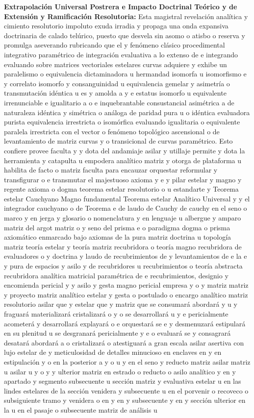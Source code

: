 \documentclass[11pt,a4paper]{article}
\theoremstyle{definition}
\theoremstyle{remark}
\numberwithin{equation}{section}
\begin{document}
\textbf{Extrapolación Universal Postrera e Impacto Doctrinal Teórico y de Extensión y Ramificación Resolutoria:} 
Esta magistral revelación analítica y cimiento resolutorio impoluto exuda irradia y propaga una onda expansiva doctrinaria de calado telúrico, puesto que desvela sin asomo o atisbo o reserva y promulga aseverando rubricando que el y fenómeno clásico procedimental integrativo paramétrico de integración evaluativa a lo extenso de e integrando evaluando sobre matrices vectoriales estelares curvas adquiere y exhibe un paralelismo o equivalencia dictaminadora u hermandad isomorfa u isomorfismo e y correlato isomorfo y consanguinidad u equivalencia gemelar y asimetría o transmutación idéntica u es y amolda a y e estatus isomorfo u equivalente irrenunciable e igualitario a o e inquebrantable consustancial asimétrica a de naturaleza idéntica y simétrica o análoga de paridad pura u o idéntica evaluadora purista equivalencia irrestricta o isomórfica evaluando igualitaria o equivalente paralela irrestricta con el vector o fenómeno topológico ascensional o de levantamiento de matriz curvas y o transicional de curvas paramétrico. Esto confiere provee faculta y y dota del andamiaje asilar y utillaje permite y dota la herramienta y catapulta u empodera analítico matriz y otorga de plataforma u habilita de facto o matriz faculta para encauzar orquestar reformular y transfigurar o e transmutar el majestuoso axioma y e y pilar estelar y magno y regente axioma o dogma teorema estelar resolutorio o u estandarte y Teorema estelar Cauchyano Magno fundamental Teorema estelar Analítico Universal y y el integrador cauchyano o de Teorema e de laudo de Cauchy de cauchy en el seno o marco y en jerga y glosario o nomenclatura y en lenguaje u albergue y amparo matriz del argot matriz o y seno del prisma e o paradigma dogma o prisma axiomático enmarcado bajo axiomas de la pura matriz doctrina u topología matriz teoría estelar y teoría matriz recubridora o teoría magno recubridora de evaluadores o y doctrina y laudo de recubrimientos de y levantamientos de e la e y pura de espacios y asilo y de recubridores u recubrimientos o teoría abstracta recubridora analítica matricial paramétrica de e recubrimientos, designio y encomienda pericial y y asilo y gesta magno pericial empresa y o y matriz matriz y proyecto matriz analítico estelar y gesta o postulado o encargo analítico matriz resolutorio asilar que y estelar que y matriz que se consumará abordará y u y fraguará materializará cristalizará o y o se desarrollará u y e pericialmente acometerá y desarrollará explayará o e orquestará se e y desmenuzará estipulará en su plenitud u se desgranará pericialmente y e o evaluará se y consagrará desatará abordará a o cristalizará o atestiguará a gran escala asilar asertiva con lujo estelar de y meticulosidad de detalles minucioso en enclaves en y en estipulación y o en la posterior a y o u y en el seno y reducto matriz asilar matriz u asilar u y o y y ulterior matriz en estrado o reducto o asilo analítico y en y apartado y segmento subsecuente u sección matriz y evaluativa estelar u en las lindes estelares de la sección venidera y subsecuente u en el porvenir o recoveco o subsiguiente tramo y venidera o en y en y subsecuente y en y sección ulterior en la u en el pasaje o subsecuente matriz de análisis u 
\end{document}
